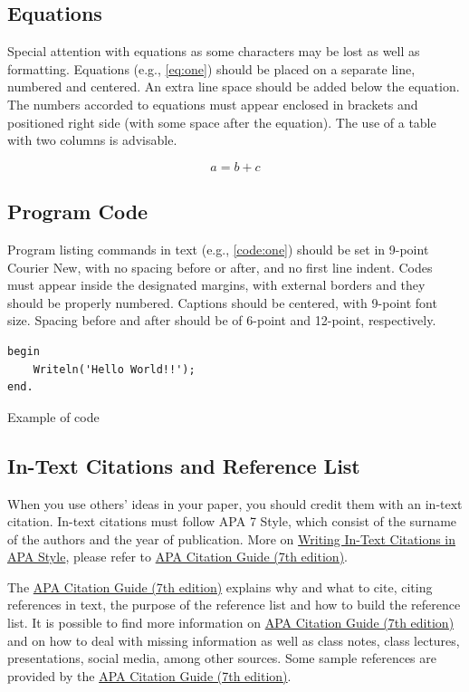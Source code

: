 \documentclass[english, spanish, brazilian]{RBIEarticle} %
\begin{document}
\subsection{Equations}
Special attention with equations as some characters may be lost as well as formatting. Equations (e.g., \autoref{eq:one}) should be placed on a separate line, numbered and centered. An extra line space should be added below the equation. The numbers accorded to equations must appear enclosed in brackets and positioned right side (with some space after the equation).
The use of a table with two columns is advisable.

\begin{equation}
	a = b + c
	\label{eq:one}
\end{equation}


\subsection{Program Code}
Program listing commands in text (e.g., \autoref{code:one}) should be set in 9-point Courier New, with no spacing before or after, and no first line indent. Codes must appear inside the designated margins, with external borders and they should be properly numbered. Captions should be centered, with 9-point font size. Spacing before and after should be of 6-point and 12-point, respectively.

\begin{code}[h]
	\begin{lstlisting}
begin
    Writeln('Hello World!!');
end.
	\end{lstlisting}
	\caption{Example of code}
	\label{code:one}
\end{code}


\subsection{In-Text Citations and Reference List}

When you use others' ideas in your paper, you should credit them with an in-text citation. In-text citations must follow APA 7 Style, which consist of the surname of the authors and the year of publication. More on \href{https://apastyle.apa.org/}{Writing In-Text Citations in APA Style}, please refer to \href{https://libguides.brenau.edu/APA7}{APA Citation Guide (7th edition)}.

The  \href{https://libguides.brenau.edu/APA7}{APA Citation Guide (7th edition)} explains why and what to cite, citing references in text, the purpose of the reference list and how to build the reference list. It is possible to find more information on  \href{https://libguides.brenau.edu/APA7}{APA Citation Guide (7th edition)} and on how to deal with missing information as well as class notes, class lectures, presentations, social media, among other sources. Some sample references are provided by the  \href{https://libguides.brenau.edu/APA7}{APA Citation Guide (7th edition)}.
\end{document}
